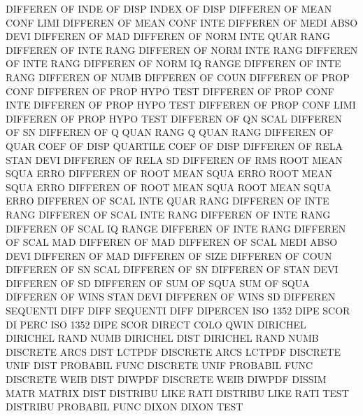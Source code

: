 DIFFEREN OF   INDE OF   DISP            INDEX    OF   DISP
DIFFEREN OF   MEAN CONF LIMI            DIFFEREN OF   MEAN CONF INTE
DIFFEREN OF   MEDI ABSO DEVI            DIFFEREN OF   MAD
DIFFEREN OF   NORM INTE QUAR RANG       DIFFEREN OF   INTE RANG
DIFFEREN OF   NORM INTE RANG            DIFFEREN OF   INTE RANG
DIFFEREN OF   NORM IQ   RANGE           DIFFEREN OF   INTE RANG
DIFFEREN OF   NUMB                      DIFFEREN OF   COUN
DIFFEREN OF   PROP CONF                 DIFFEREN OF   PROP HYPO TEST
DIFFEREN OF   PROP CONF INTE            DIFFEREN OF   PROP HYPO TEST
DIFFEREN OF   PROP CONF LIMI            DIFFEREN OF   PROP HYPO TEST
DIFFEREN OF   QN   SCAL                 DIFFEREN OF   SN
DIFFEREN OF   Q    QUAN RANG            Q        QUAN RANG
DIFFEREN OF   QUAR COEF OF   DISP       QUARTILE COEF OF   DISP
DIFFEREN OF   RELA STAN DEVI            DIFFEREN OF   RELA SD
DIFFEREN OF   RMS                       ROOT     MEAN SQUA ERRO
DIFFEREN OF   ROOT MEAN SQUA ERRO       ROOT     MEAN SQUA ERRO
DIFFEREN OF   ROOT MEAN SQUA            ROOT     MEAN SQUA ERRO
DIFFEREN OF   SCAL INTE QUAR RANG       DIFFEREN OF   INTE RANG
DIFFEREN OF   SCAL INTE RANG            DIFFEREN OF   INTE RANG
DIFFEREN OF   SCAL IQ   RANGE           DIFFEREN OF   INTE RANG
DIFFEREN OF   SCAL MAD                  DIFFEREN OF   MAD
DIFFEREN OF   SCAL MEDI ABSO DEVI       DIFFEREN OF   MAD
DIFFEREN OF   SIZE                      DIFFEREN OF   COUN
DIFFEREN OF   SN   SCAL                 DIFFEREN OF   SN
DIFFEREN OF   STAN DEVI                 DIFFEREN OF   SD
DIFFEREN OF   SUM  OF   SQUA            SUM      OF   SQUA
DIFFEREN OF   WINS STAN DEVI            DIFFEREN OF   WINS SD
DIFFEREN                                SEQUENTI DIFF
DIFF                                    SEQUENTI DIFF
DIPERCEN                                ISO      1352 DIPE SCOR
DI       PERC                           ISO      1352 DIPE SCOR
DIRECT   COLO                           QWIN
DIRICHEL                                DIRICHEL RAND NUMB
DIRICHEL DIST                           DIRICHEL RAND NUMB
DISCRETE ARCS DIST                      LCTPDF
DISCRETE ARCS                           LCTPDF
DISCRETE UNIF DIST                      PROBABIL FUNC
DISCRETE UNIF                           PROBABIL FUNC
DISCRETE WEIB DIST                      DIWPDF
DISCRETE WEIB                           DIWPDF
DISSIM   MATR                           MATRIX   DIST
DISTRIBU LIKE RATI                      DISTRIBU LIKE RATI TEST
DISTRIBU                                PROBABIL FUNC
DIXON                                   DIXON    TEST
